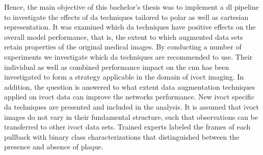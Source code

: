 Hence, the main objective of this bachelor’s thesis was to implement a \acrshort{dl} pipeline to investigate the effects of \acrshort{da} techniques tailored to polar as well as cartesian representation. It was examined which \acrshort{da} techniques have positive effects on the overall model performance, that is, the extent to which augmented data sets retain properties of the original medical images. By conducting a number of experiments we investigate which \acrshort{da} techniques are recommended to use. Their individual as well as combined performance impact on the \acrshort{cnn} has been investigated to form a strategy applicable in the domain of \acrshort{ivoct} imaging. In addition, the question is answered to what extent data augmentation techniques applied on \acrshort{ivoct} data can improve the networks performance. New \acrshort{ivoct} specific \acrshort{da} techniques are presented and included in the analysis. It is assumed that \acrshort{ivoct} images do not vary in their fundamental structure, such that observations can be transferred to other \acrshort{ivoct} data sets. Trained experts labeled the frames of each pullback with binary class characterizations that distinguished between the presence and absence of plaque.
